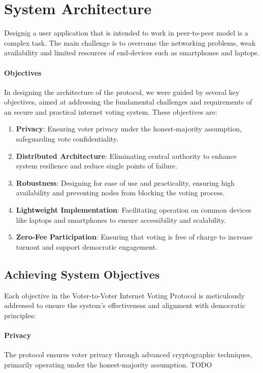 \documentclass{article}
\begin{document}
\section{System Architecture}
Designig a user application that is intended to work in peer-to-peer model is a complex task. The main challenge is to overcome the networking problems, weak availability and limited resources of end-devices such as smartphones and laptops.

\paragraph{Objectives}
In designing the architecture of the protocol, we were guided by several key objectives, aimed at addressing the fundamental challenges and requirements of an secure and practical internet voting system. These objectives are:

\begin{enumerate}
    \item \textbf{Privacy}: Ensuring voter privacy under the honest-majority assumption, safeguarding vote confidentiality.
    \item \textbf{Distributed Architecture}: Eliminating central authority to enhance system resilience and reduce single points of failure.
    \item \textbf{Robustness}: Designing for ease of use and practicality, ensuring high availability and preventing nodes from blocking the voting process.
    \item \textbf{Lightweight Implementation}: Facilitating operation on common devices like laptops and smartphones to ensure accessibility and scalability.
    \item \textbf{Zero-Fee Participation}: Ensuring that voting is free of charge to increase turnout and support democratic engagement.
\end{enumerate}

\subsection{Achieving System Objectives}
Each objective in the Voter-to-Voter Internet Voting Protocol is meticulously addressed to ensure the system's effectiveness and alignment with democratic principles:

\paragraph{Privacy}
The protocol ensures voter privacy through advanced cryptographic techniques, primarily operating under the honest-majority assumption. TODO
\end{document}
